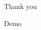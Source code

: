 \documentclass{beamer}
\begin{document}
\begin{frame}
    \Huge{\centerline{Thank you}}
    \Huge{\centerline{Demo}}
\end{frame}


%
%
%
\end{document}
